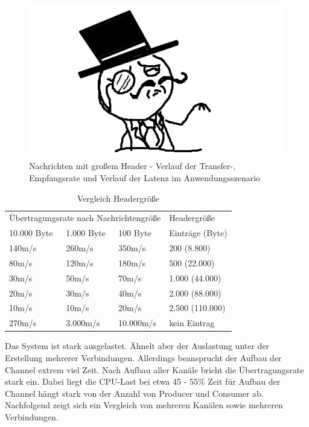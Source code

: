 \documentclass[	a4paper,
			11pt,
			titlepage,
			oneside,
			fleqn,
			listof=totoc,
			parskip,
			numbers=noenddot]{scrartcl}
\begin{document}
		\begin{figure}[!htb]
			\centering
			\includegraphics[width=\textwidth]{img/stub.png}
			\caption{Nachrichten mit großem Header - Verlauf der Transfer-, Empfangsrate und Verlauf der Latenz im Anwendungsszenario}
			\label{fig:header-scenario}
		\end{figure}
		
		
		\begin{table}[!htb]
			\centering
			\begin{tabular}{p{3cm}ll|p{3cm}}
				\multicolumn{3}{l|}{Übertragungsrate nach Nachrichtengröße}  & Headergröße     \\
				10.000 Byte          & 1.000 Byte              & 100 Byte    & Einträge (Byte) \\ \hline
				140m/s               & 260m/s                  & 350m/s      & 200 (8.800)     \\
				80m/s                & 120m/s                  & 180m/s      & 500 (22.000)    \\
				30m/s                & 50m/s                   & 70m/s       & 1.000 (44.000)  \\
				20m/s                & 30m/s                   & 40m/s       & 2.000 (88.000)  \\
				10m/s                & 10m/s                   & 20m/s       & 2.500 (110.000) \\ \hline
				270m/s               & 3.000m/s                & 10.000m/s   & kein Eintrag
			\end{tabular}
			\caption{Vergleich Headergröße}
		\end{table}
	
	
	\clearpage
		{%
		  \newline
		  \newline
		  \newline
		}{%
		 Das System ist stark ausgelastet. Ähnelt aber der Auslastung unter der Erstellung mehrerer Verbindungen. Allerdings beansprucht  der Aufbau der Channel extrem viel Zeit. Nach Aufbau aller Kanäle bricht die Übertragungsrate stark ein. Dabei liegt die CPU-Last bei etwa 45 - 55\%
		}{%
		 Zeit für Aufbau der Channel hängt stark von der Anzahl von Producer und Consumer ab. Nachfolgend zeigt sich ein Vergleich von mehreren Kanälen sowie mehreren Verbindungen.
		}
\end{document}
